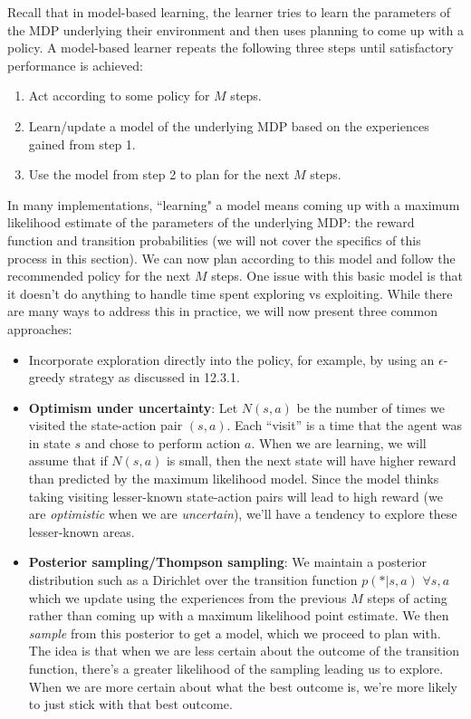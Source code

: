 \noindent Recall that in model-based learning, the learner tries to learn the parameters of the MDP underlying their environment and then uses planning to come up with a policy. A model-based learner repeats the following three steps until satisfactory performance is achieved:
\begin{enumerate}
    \item Act according to some policy for $M$ steps.
    \item Learn/update a model of the underlying MDP based on the experiences gained from step 1.
    \item Use the model from step 2 to plan for the next $M$ steps.
\end{enumerate}
In many implementations, ``learning" a model means coming up with a maximum likelihood estimate of the parameters of the underlying MDP: the reward function and transition probabilities (we will not cover the specifics of this process in this section). We can now plan according to this model and follow the recommended policy for the next $M$ steps. One issue with this basic model is that it doesn't do anything to handle time spent exploring vs exploiting. While there are many ways to address this in practice, we will now present three common approaches:
\begin{itemize}
    \item Incorporate exploration directly into the policy, for example, by using an $\epsilon$-greedy strategy as discussed in 12.3.1.
    \item \textbf{Optimism under uncertainty}: Let $N(s,a)$ be the number of times we visited the state-action pair $(s,a)$. Each ``visit” is a time that the agent was in state $s$ and chose to perform action $a$. When we are learning, we will assume that if $N(s,a)$ is small, then the next state will have higher reward than predicted by the maximum likelihood model. Since the model thinks taking visiting lesser-known state-action pairs will lead to high reward (we are \textit{optimistic} when we are \textit{uncertain}), we’ll have a tendency to explore these lesser-known areas.
    \item \textbf{Posterior sampling/Thompson sampling}: We maintain a posterior distribution such as a Dirichlet over the transition function $p(*|s, a)$ $\forall s, a$ which we update using the experiences from the previous $M$ steps of acting rather than coming up with a maximum likelihood point estimate. We then \textit{sample} from this posterior to get a model, which we proceed to plan with. The idea is that when we are less certain about the outcome of the transition function, there’s a greater likelihood of the sampling leading us to explore. When we are more certain about what the best outcome is, we’re more likely to just stick with that best outcome.
\end{itemize}
